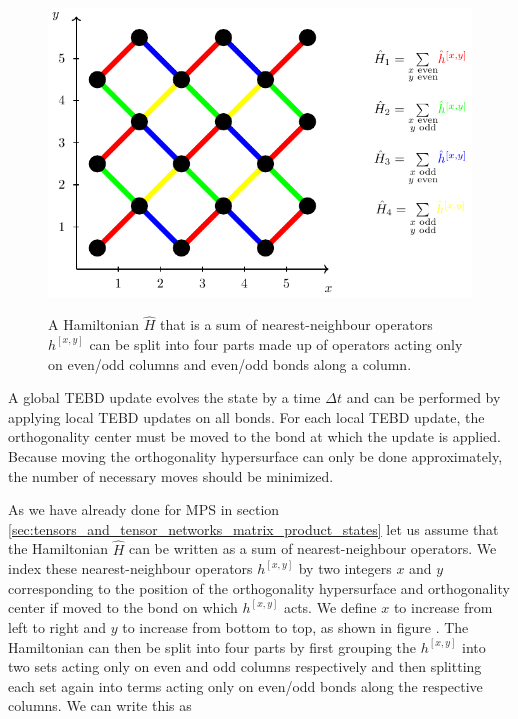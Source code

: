 \begin{figure}
	\centering
	\subcaptionbox{\label{fig:disoTPS_TEBD_global_update_TEBD1_splitting}}
	{%
		\includegraphics[scale=1]{figures/tikz/disoTPS/tebd_global_update/tebd_global_update_a.pdf}
	}
	\caption{A Hamiltonian $\hat{H}$ that is a sum of nearest-neighbour operators $h^{[x,y]}$ can be split into four parts made up of operators acting only on even/odd columns and even/odd bonds along a column.}
	\label{fig:disoTPS_TEBD_global_update_TEBD1_splitting_and_TEBD2_chain}
\end{figure}
A global TEBD update evolves the state by a time $\Delta t$ and can be performed by applying local TEBD updates on all bonds. For each local TEBD update, the orthogonality center must be moved to the bond at which the update is applied. Because moving the orthogonality hypersurface can only be done approximately, the number of necessary moves should be minimized. \par
As we have already done for MPS in section \ref{sec:tensors_and_tensor_networks_matrix_product_states} let us assume that the Hamiltonian $\hat{H}$ can be written as a sum of nearest-neighbour operators. We index these nearest-neighbour operators $h^{[x, y]}$ by two integers $x$ and $y$ corresponding to the position of the orthogonality hypersurface and orthogonality center if moved to the bond on which $h^{[x,y]}$ acts. We define $x$ to increase from left to right and $y$ to increase from bottom to top, as shown in figure . The Hamiltonian can then be split into four parts by first grouping the $h^{[x,y]}$ into two sets acting only on even and odd columns respectively and then splitting each set again into terms acting only on even/odd bonds along the respective columns. We can write this as
